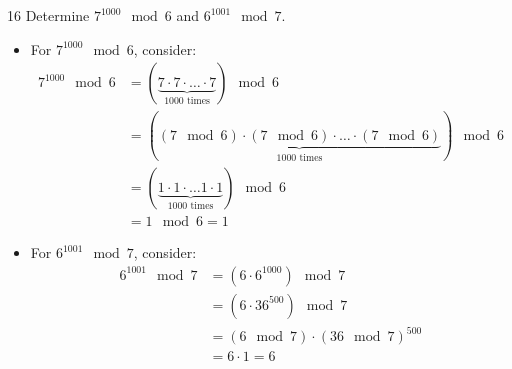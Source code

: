 \begin{hwproblem}
{16}{
    Determine \(7^{1000} \mod 6\) and \(6^{1001} \mod 7\).
}

\begin{itemize}
    \item For \(7^{1000} \mod 6\), consider:
        \[
        \begin{aligned}
            7^{1000} \mod 6 &= \left(\underbrace{7 \cdot 7 \cdot \ldots \cdot 7}_{\text{1000 times}}\right) \mod 6 \\
                            &= \left(\underbrace{(7 \mod 6) \cdot (7 \mod 6) \cdot \ldots \cdot (7 \mod 6)}_{\text{1000 times}}\right) \mod 6 \\
                            &= \left(\underbrace{1 \cdot 1 \cdot \ldots 1 \cdot 1}_{\text{1000 times}}\right) \mod 6 \\
                            &= 1 \mod 6 = 1
        \end{aligned}
        \]

    \item For \(6^{1001} \mod 7\), consider:
        \[
        \begin{aligned}
            6^{1001} \mod 7 &= \left(6 \cdot 6^{1000}\right) \mod 7 \\
                            &= \left(6 \cdot 36^{500}\right) \mod 7 \\
                            &= (6 \mod 7) \cdot (36 \mod 7)^{500} \\
                            &= 6 \cdot 1 = 6
        \end{aligned}
        \]
\end{itemize}
    
\end{hwproblem}

